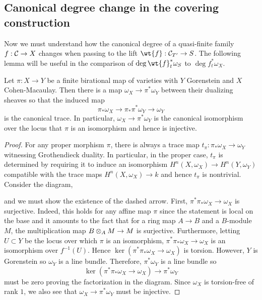 \documentclass[main.tex]{subfiles}
\begin{document}
\subsection{Canonical degree change in the covering construction}

Now we must understand how the canonical degree of a quasi-finite family $f : \mathcal{C} \to X$ changes when passing to the lift $\wt{f} : \cC_{T'} \to S$. The following lemma will be useful in the comparison of $\deg{\wt{f}_t^* \omega_S}$ to $\deg{f^*_t \omega_X}$. 

\begin{lemma} \label{lem:birational_finite_duality_map}
Let $\pi : X \to Y$ be a finite birational map of varieties with $Y$ Gorenstein and $X$ Cohen-Macaulay. Then there is a map $\omega_X \to \pi^* \omega_Y$ between their dualizing sheaves so that the induced map
\[ \pi_* \omega_X \to \pi_* \pi^* \omega_Y \to \omega_Y \]
is the canonical trace. In particular, $\omega_X \to \pi^* \omega_Y$ is the canonical isomorphism over the locus that $\pi$ is an isomorphism and hence is injective.  
\end{lemma}

\begin{proof}
For any proper morphism $\pi$, there is always a trace map $t_{\pi} : \pi_* \omega_X \to \omega_Y$ witnessing Grothendieck duality. In particular, in the proper case, $t_{\pi}$ is determined by requiring it to induce an isomorphism $H^n(X, \omega_X) \to H^n(Y, \omega_Y)$ compatible with the trace maps $H^n(X, \omega_X) \to k$ and hence $t_{\pi}$ is nontrivial. Consider the diagram,
\begin{center}
\end{center}
and we must show the existence of the dashed arrow. First, $\pi^* \pi_* \omega_X \to \omega_X$ is surjective. Indeed, this holds for any affine map $\pi$ since the statement is local on the base and it amounts to the fact that for a ring map $A \to B$ and a $B$-module $M$, the multiplication map $B \otimes_A M \to M$ is surjective.  Furthermore, letting $U \subset Y$ be the locus over which $\pi$ is an isomorphism, $\pi^* \pi_* \omega_X \to \omega_X$ is an isomorphism over $f^{-1}(U)$. Hence $\ker{(\pi^* \pi_* \omega_X \to \omega_X)}$ is torsion. However, $Y$ is Gorenstein so $\omega_Y$ is a line bundle. Therefore, $\pi^* \omega_Y$ is a line bundle so 
\[ \ker{(\pi^* \pi_* \omega_X \to \omega_X)} \to \pi^* \omega_Y \]
must be zero proving the factorization in the diagram. Since $\omega_X$ is torsion-free of rank $1$, we also see that $\omega_X \to \pi^* \omega_Y$ must be injective. 
\end{proof}
\end{document}
